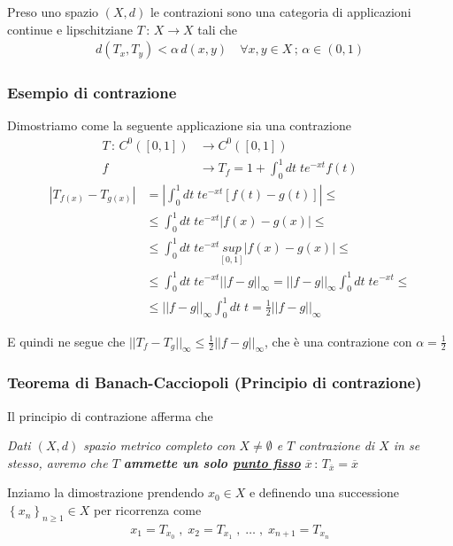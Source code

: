 Preso uno spazio $(X,d)$ le contrazioni sono una categoria di applicazioni continue e lipschitziane $T \, : \, X \longrightarrow X$ tali che
\begin{align}
d(T_x,T_y)<\alpha \, d(x,y) \quad \forall x,y \in X \, ; \, \alpha \in (0,1)
\end{align}

\subsubsection{Esempio di contrazione}
Dimostriamo come la seguente applicazione sia una contrazione
\begin{align}
T \, : \, C^0([0,1]) {}&\longrightarrow C^0([0,1]) \\
f & \longrightarrow T_f= 1 + \int_{0}^{1} dt \; t e^{-xt}f(t) \nonumber
\end{align}
\begin{align}
|T_{f(x)} - T_{g(x)}| {}&= |\int_{0}^{1} dt \; te^{-xt}[f(t) - g(t)]| \leq \nonumber \\
&\leq \int_{0}^{1} dt \; te^{-xt}|f(x) - g(x)|  \leq \nonumber \\
&\leq \int_{0}^{1} dt \; te^{-xt} \underset{[0,1]}{sup}|f(x) - g(x)|  \leq \nonumber \\
&\leq \int_{0}^{1} dt \; te^{-xt} ||f-g||_\infty=  ||f-g||_\infty \int_{0}^{1} dt \; te^{-xt}  \leq \nonumber \\
& \leq ||f-g||_\infty \int_{0}^{1} dt \; t = \frac{1}{2} ||f-g||_\infty
\end{align}

E quindi ne segue che $||T_f -T_g||_\infty \leq \frac{1}{2} ||f-g||_\infty$, che è una contrazione con $\alpha=\frac{1}{2}$

\subsubsection{Teorema di Banach-Cacciopoli (Principio di contrazione)}

Il principio di contrazione afferma che 
\bigskip

\textit{ Dati $(X,d)$ spazio metrico completo con $X\neq \emptyset$ e $T$ contrazione di $X$ in se stesso, avremo che $T$ \textbf{ammette un solo \underline{punto fisso}} $\overline{x} \, : \, T_{\overline{x}} = \overline{x}$}

\bigskip

Inziamo la dimostrazione prendendo $x_0 \in X$ e definendo una successione $\left\{ x_n\right\}_{n \geq 1} \in X$ per ricorrenza come
\begin{align}
x_1= T_{x_0}\;  , \; x_2 = T_{x_1} \;  , \; \dots \;  , \; x_{n+1} = T_{x_n}
\end{align}

